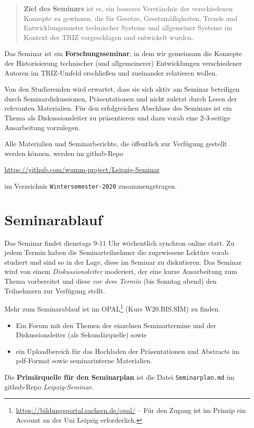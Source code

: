 \documentclass[11pt,a4paper]{article}
\begin{document}
\begin{quote}
  \textbf{Ziel des Seminars} ist es, ein besseres Verständnis der
  verschiedenen Konzepte zu gewinnen, die für Gesetze, Gesetzmäßigkeiten,
  Trends und Entwicklungsmuster technischer Systeme und allgemeiner Systeme
  im Kontext der TRIZ vorgeschlagen und entwickelt wurden.
\end{quote}

Das Seminar ist ein \textbf{Forschungsseminar}, in dem wir gemeinsam die
Konzepte der Historisierung technischer (und allgemeinerer) Entwicklungen
verschiedener Autoren im TRIZ-Umfeld erschließen und zueinander relatieren
wollen.

Von den Studierenden wird erwartet, dass sie sich aktiv am Seminar beteiligen
durch Seminardiskussionen, Präsentationen und nicht zuletzt durch Lesen der
relevanten Materialien.  Für den erfolgreichen Abschluss des Seminars ist ein
Thema als Diskussionsleiter zu präsentieren und dazu vorab eine 2-3-seitige
Ausarbeitung vorzulegen.

Alle Materialien und Seminarberichte, die öffentlich zur Verfügung gestellt
werden können, werden im github-Repo
\begin{center}
  \url{https://github.com/wumm-project/Leipzig-Seminar}
\end{center}
im Verzeichnis \texttt{Wintersemester-2020} zusammengetragen.

\section{Seminarablauf}

Das Seminar findet dienstags 9-11 Uhr wöchentlich synchron online statt.  Zu
jedem Termin haben die Seminarteilnehmer die zugewiesene Lektüre vorab
studiert und sind so in der Lage, diese im Seminar zu diskutieren.  Das
Seminar wird von einem \emph{Diskussionsleiter} moderiert, der eine kurze
Ausarbeitung zum Thema vorbereitet und diese \emph{vor dem Termin} (bis
Sonntag abend) den Teilnehmern zur Verfügung stellt.

Mehr zum Seminarablauf ist im
OPAL\footnote{\url{https://bildungsportal.sachsen.de/opal/} -- Für den Zugang
  ist im Prinzip ein Account an der Uni Leipzig erforderlich.} (Kurs
W20.BIS.SIM) zu finden.
\begin{itemize}
\item Ein Forum mit den Themen der einzelnen Seminartermine und der
  Diskussionsleiter (als Sekundärquelle) sowie
\item ein Uploadbereich für das Hochladen der Präsentationen und Abstracts im
  pdf-Format sowie seminarinterne Materialien.
\end{itemize}
Die \textbf{Primärquelle für den Seminarplan} ist die Datei
\texttt{Seminarplan.md} im github-Repo \emph{Leipzig-Seminar}.
\end{document}
